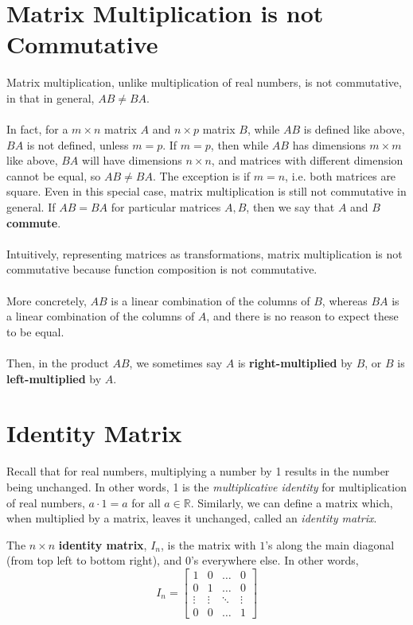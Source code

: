 \documentclass[letterpaper,12pt]{article}
\begin{document}
\section*{Matrix Multiplication is not Commutative}
Matrix multiplication, unlike multiplication of real numbers, is not commutative, in that in general, $AB \neq BA$.
\\ \\ In fact, for a $m \times n$ matrix $A$ and $n \times p$ matrix $B$, while $AB$ is defined like above, $BA$ is not defined, unless $m = p$. If $m = p$, then while $AB$ has dimensions $m \times m$ like above, $BA$ will have dimensions $n \times n$, and matrices with different dimension cannot be equal, so $AB \neq BA$. The exception is if $m = n$, i.e. both matrices are square. Even in this special case, matrix multiplication is still not commutative in general. If $AB = BA$ for particular matrices $A, B$, then we say that $A$ and $B$ \textbf{commute}.
\\ \\ Intuitively, representing matrices as transformations, matrix multiplication is not commutative because function composition is not commutative.
\\ \\ More concretely, $AB$ is a linear combination of the columns of $B$, whereas $BA$ is a linear combination of the columns of $A$, and there is no reason to expect these to be equal.
\\ \\ Then, in the product $AB$, we sometimes say $A$ is \textbf{right-multiplied} by $B$, or $B$ is \textbf{left-multiplied} by $A$.

\section*{Identity Matrix}
Recall that for real numbers, multiplying a number by 1 results in the number being unchanged. In other words, 1 is the \textit{multiplicative identity} for multiplication of real numbers, $a \cdot 1 = a$ for all $a \in \mathbb{R}$. Similarly, we can define a matrix which, when multiplied by a matrix, leaves it unchanged, called an \textit{identity matrix}.

\begin{definition}
The $n \times n$ \textbf{identity matrix}, $I_n$, is the matrix with $1$'s along the main diagonal (from top left to bottom right), and $0$'s everywhere else. In other words,
\begin{equation*}
    I_n = \begin{bmatrix} 1 & 0 & \dots & 0 \\ 0 & 1 & \dots & 0 \\ \vdots & \vdots & \ddots & \vdots \\ 0 & 0 & \dots & 1 \end{bmatrix}
\end{equation*}
\end{definition}
\end{document}
